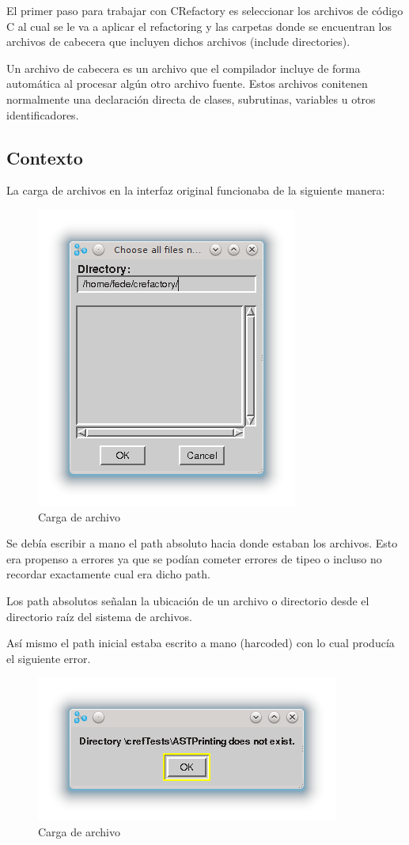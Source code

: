 \documentclass[a4paper,oneside,10pt]{article}
\begin{document}
El primer paso para trabajar con CRefactory es seleccionar los archivos de c\'odigo C al cual se le va a aplicar el refactoring y las carpetas donde se encuentran los archivos de cabecera que incluyen dichos archivos (include directories).

Un archivo de cabecera es un archivo que el compilador incluye de forma automática al procesar algún otro archivo fuente. Estos archivos conitenen normalmente una declaración directa de clases, subrutinas, variables u otros identificadores.

\subsection{Contexto}
La carga de archivos en la interfaz original funcionaba de la siguiente manera:

\begin{figure}[h!]
  \centering
    \includegraphics[scale=0.85]{images/codigo_original/carga.png}
    \caption{Carga de archivo}
\end{figure}

Se deb\'ia escribir a mano el path absoluto hacia donde estaban los archivos. Esto era propenso a errores ya que se podían cometer errores de tipeo o incluso no recordar exactamente cual era dicho path.

Los path absolutos señalan la ubicación de un archivo o directorio desde el directorio raíz del sistema de archivos.

As\'i mismo el path inicial estaba escrito a mano (harcoded) con lo cual producía el siguiente error.

\begin{figure}[h!]
  \centering
    \includegraphics[scale=0.85]{images/codigo_original/error.png}
    \caption{Carga de archivo}
\end{figure}
\end{document}
